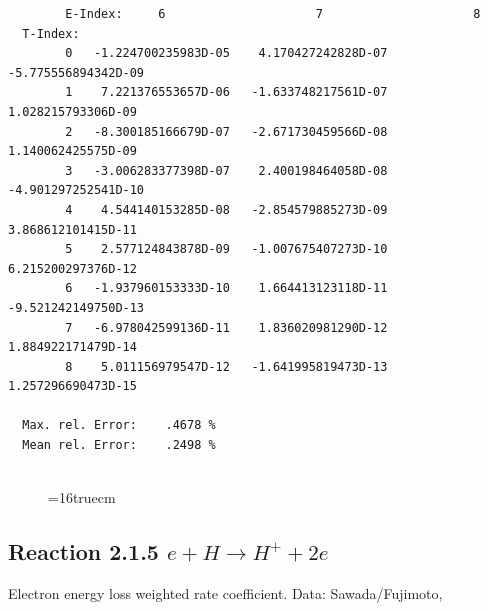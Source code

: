 \documentclass[12pt,dvips]{article}
\begin{document}
\begin{small}
\begin{verbatim}
        E-Index:     6                     7                     8
  T-Index:
        0   -1.224700235983D-05    4.170427242828D-07   -5.775556894342D-09
        1    7.221376553657D-06   -1.633748217561D-07    1.028215793306D-09
        2   -8.300185166679D-07   -2.671730459566D-08    1.140062425575D-09
        3   -3.006283377398D-07    2.400198464058D-08   -4.901297252541D-10
        4    4.544140153285D-08   -2.854579885273D-09    3.868612101415D-11
        5    2.577124843878D-09   -1.007675407273D-10    6.215200297376D-12
        6   -1.937960153333D-10    1.664413123118D-11   -9.521242149750D-13
        7   -6.978042599136D-11    1.836020981290D-12    1.884922171479D-14
        8    5.011156979547D-12   -1.641995819473D-13    1.257296690473D-15

  Max. rel. Error:    .4678 %
  Mean rel. Error:    .2498 %


\end{verbatim}\end{small}
\begin{figure} \label{2.1.5i}
\epsfxsize=16truecm
\end{figure}
\newpage

\subsection{
Reaction 2.1.5  $ e + H \rightarrow H^+ + 2e $
}
Electron energy loss weighted rate coefficient. Data: Sawada/Fujimoto, \cite{kn:Sawada}
\end{document}
